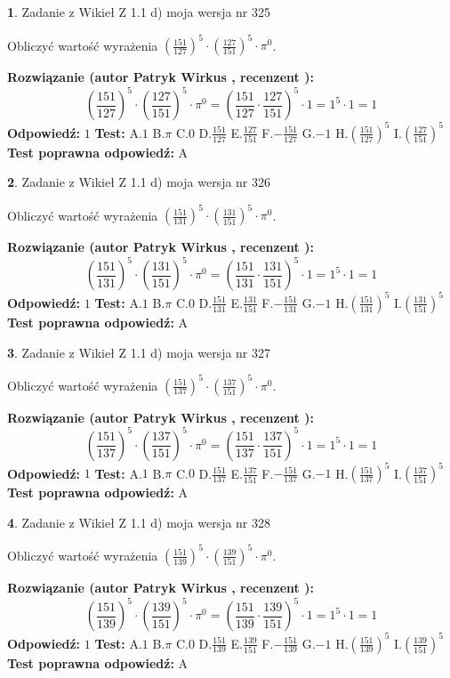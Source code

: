 \documentclass[12pt, a4paper]{article}
\theoremstyle{definition} %
\newtheorem{zad}{}
\newcommand{\zadStart}[1]{\begin{zad}#1\newline}
\newcommand{\zadStop}{\end{zad}}
\newcommand{\rozwStart}[2]{\noindent \textbf{Rozwiązanie (autor #1 , recenzent #2): }\newline}
\newcommand{\rozwStop}{\newline}
\newcommand{\odpStart}{\noindent \textbf{Odpowiedź:}\newline}
\newcommand{\odpStop}{\newline}
\newcommand{\testStart}{\noindent \textbf{Test:}\newline}
\newcommand{\testStop}{\newline}
\newcommand{\kluczStart}{\noindent \textbf{Test poprawna odpowiedź:}\newline}
\newcommand{\kluczStop}{\newline}
\begin{document}
\zadStart{Zadanie z Wikieł Z 1.1 d) moja wersja nr 325}

Obliczyć wartość wyrażenia $(\frac{151}{127})^{5} \cdot (\frac{127}{151})^{5} \cdot \pi^{0}$.
\zadStop
\rozwStart{Patryk Wirkus}{}
$$(\frac{151}{127})^{5} \cdot (\frac{127}{151})^{5} \cdot \pi^{0} = (\frac{151}{127} \cdot \frac{127}{151})^{5} \cdot 1 = 1^{5} \cdot 1 = 1$$
\rozwStop
\odpStart
$1$
\odpStop
\testStart
A.$1$ B.$\pi$ C.$0$ D.$\frac{151}{127}$ E.$\frac{127}{151}$
F.$-\frac{151}{127}$ G.$-1$
H.$(\frac{151}{127})^{5}$
I.$(\frac{127}{151})^{5}$
\testStop
\kluczStart
A
\kluczStop



\zadStart{Zadanie z Wikieł Z 1.1 d) moja wersja nr 326}

Obliczyć wartość wyrażenia $(\frac{151}{131})^{5} \cdot (\frac{131}{151})^{5} \cdot \pi^{0}$.
\zadStop
\rozwStart{Patryk Wirkus}{}
$$(\frac{151}{131})^{5} \cdot (\frac{131}{151})^{5} \cdot \pi^{0} = (\frac{151}{131} \cdot \frac{131}{151})^{5} \cdot 1 = 1^{5} \cdot 1 = 1$$
\rozwStop
\odpStart
$1$
\odpStop
\testStart
A.$1$ B.$\pi$ C.$0$ D.$\frac{151}{131}$ E.$\frac{131}{151}$
F.$-\frac{151}{131}$ G.$-1$
H.$(\frac{151}{131})^{5}$
I.$(\frac{131}{151})^{5}$
\testStop
\kluczStart
A
\kluczStop



\zadStart{Zadanie z Wikieł Z 1.1 d) moja wersja nr 327}

Obliczyć wartość wyrażenia $(\frac{151}{137})^{5} \cdot (\frac{137}{151})^{5} \cdot \pi^{0}$.
\zadStop
\rozwStart{Patryk Wirkus}{}
$$(\frac{151}{137})^{5} \cdot (\frac{137}{151})^{5} \cdot \pi^{0} = (\frac{151}{137} \cdot \frac{137}{151})^{5} \cdot 1 = 1^{5} \cdot 1 = 1$$
\rozwStop
\odpStart
$1$
\odpStop
\testStart
A.$1$ B.$\pi$ C.$0$ D.$\frac{151}{137}$ E.$\frac{137}{151}$
F.$-\frac{151}{137}$ G.$-1$
H.$(\frac{151}{137})^{5}$
I.$(\frac{137}{151})^{5}$
\testStop
\kluczStart
A
\kluczStop



\zadStart{Zadanie z Wikieł Z 1.1 d) moja wersja nr 328}

Obliczyć wartość wyrażenia $(\frac{151}{139})^{5} \cdot (\frac{139}{151})^{5} \cdot \pi^{0}$.
\zadStop
\rozwStart{Patryk Wirkus}{}
$$(\frac{151}{139})^{5} \cdot (\frac{139}{151})^{5} \cdot \pi^{0} = (\frac{151}{139} \cdot \frac{139}{151})^{5} \cdot 1 = 1^{5} \cdot 1 = 1$$
\rozwStop
\odpStart
$1$
\odpStop
\testStart
A.$1$ B.$\pi$ C.$0$ D.$\frac{151}{139}$ E.$\frac{139}{151}$
F.$-\frac{151}{139}$ G.$-1$
H.$(\frac{151}{139})^{5}$
I.$(\frac{139}{151})^{5}$
\testStop
\kluczStart
A
\kluczStop
\end{document}
